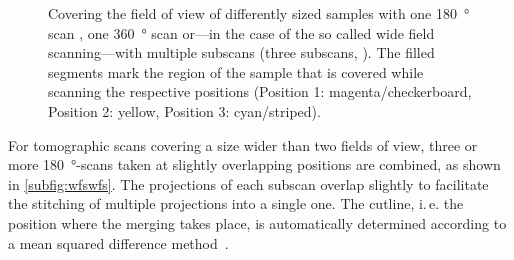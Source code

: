 \begin{figure}
{
		\label{subfig:wfswfs}		
	}%
	\caption[Covering the field of view of differently sized samples]{Covering the field of view of differently sized samples with one \SI{180}{\degree} scan , one \SI{360}{\degree} scan  or---in the case of the so called wide field scanning---with multiple subscans (three subscans, ). The filled segments mark the region of the sample that is covered while scanning the respective positions (Position 1: magenta/checkerboard, Position 2: yellow, Position 3: cyan/striped).}
	\label{fig:scanning-possibilities}
\end{figure}

For tomographic scans covering a size wider than two fields of view, three or more \SI{180}{\degree}-scans taken at slightly overlapping positions are combined, as shown in \autoref{subfig:wfswfs}. The projections of each subscan overlap slightly to facilitate the stitching of multiple projections into a single one. The cutline, i.\,e. the position where the merging takes place, is automatically determined according to a mean squared difference method~\cite{Hintermueller2010}.

